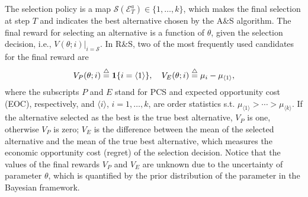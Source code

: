 \documentclass[journal]{IEEEtran}
\newcommand{\ed}{\stackrel{\triangle}{=}}
\begin{document}
    The selection policy is a map $\mathcal{S}(\mathcal{E}_T^a)\in \{1,\ldots,k\}$, which makes the final selection at step $T$ and  indicates the best alternative chosen by the A\&S algorithm.
   The final reward for selecting an alternative is a function of $\theta$, given the selection decision, i.e., $V(\theta;i)|_{i=\mathcal{S}}$. In R\&S, two of the most frequently used candidates for the final reward are
   \begin{align*}
   V_{P}(\theta;i)\ed{\bf1}\{ i=\langle 1 \rangle \},\quad V_{E}(\theta;i)\ed\mu_{i}-\mu_{\langle 1 \rangle},
   \end{align*}
   where %
   the subscripts $P$ and $E$  stand for PCS and expected opportunity cost (EOC), respectively, and $\langle i \rangle$, $i=1,\ldots,k$, are order statistics s.t. $\mu_{\langle 1 \rangle}>\cdots>\mu_{\langle k\rangle}$. If the alternative selected as the best is the true best alternative, $V_P$ is one, otherwise $V_P$ is zero; $V_E$ is the difference between the mean of the selected alternative and the mean of the true best alternative, which measures the economic opportunity cost (regret) of the selection decision. Notice that the values of the final rewards $V_P$ and $V_E$ are unknown due to the uncertainty of parameter $\theta$, which is quantified by the prior distribution of the parameter in the Bayesian framework. 
   
\end{document}
